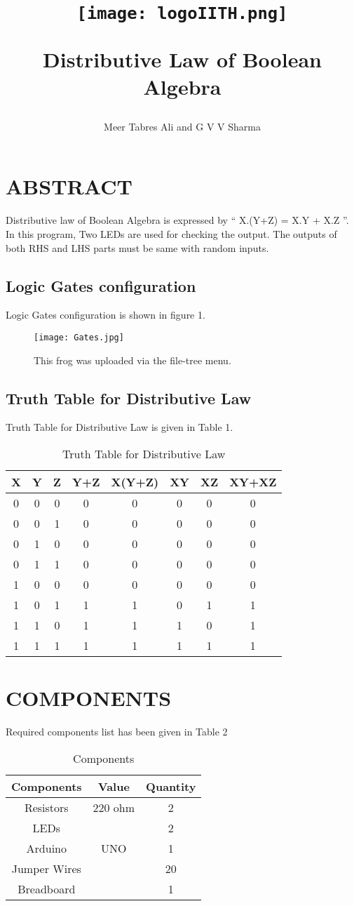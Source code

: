 \documentclass[conference]{IEEEtran}
\title{
\begin{center}
\texttt{[image: logoIITH.png]}
\end{center}
\vspace{1cm}
{Distributive Law of Boolean Algebra}
}
\author{Meer Tabres Ali and G V V Sharma}
\begin{document}
\maketitle
\section{ABSTRACT}
Distributive law of Boolean Algebra is expressed by “ X.(Y+Z) = X.Y + X.Z ”. In this program, Two LEDs are used for checking the output. The outputs of both RHS and LHS parts must be same with random inputs.
\subsection{Logic Gates configuration}
Logic Gates configuration is shown in figure 1. 
\begin{figure}[h]
\centering
\texttt{[image: Gates.jpg]}
\caption{\label{fig:Gates}This frog was uploaded via the file-tree menu.}
\end{figure}
\subsection{Truth Table for Distributive Law}
Truth Table for Distributive Law is given in Table 1.
\begin{table}[htbp]
    \centering
\begin{tabular}{ | c | c | c | c | c | c | c | c | } \hline
X & Y & Z & Y+Z & X(Y+Z) & XY & XZ & XY+XZ \\\hline
0 & 0 & 0 & 0 & 0 & 0 & 0 & 0 \\
0 & 0 & 1 & 0 & 0 & 0 & 0 & 0 \\
0 & 1 & 0 & 0 & 0 & 0 & 0 & 0 \\
0 & 1 & 1 & 0 & 0 & 0 & 0 & 0 \\
1 & 0 & 0 & 0 & 0 & 0 & 0 & 0 \\
1 & 0 & 1 & 1 & 1 & 0 & 1 & 1 \\
1 & 1 & 0 & 1 & 1 & 1 & 0 & 1 \\
1 & 1 & 1 & 1 & 1 & 1 & 1 & 1 \\ \hline
\end{tabular}
\caption{\label{tab:widgets}Truth Table for Distributive Law}
\end{table}
\section{COMPONENTS}
Required components list has been given in Table 2
\begin{table}
\centering
\begin{tabular}{| c | c | c |} \hline
Components & Value & Quantity \\\hline
Resistors & 220 ohm & 2 \\
LEDs &  & 2 \\
Arduino & UNO & 1 \\
Jumper Wires &  & 20 \\
Breadboard & & 1 \\ 
\hline
\end{tabular}
\caption{\label{tab:widgets}Components}
\end{table}
\end{document}
